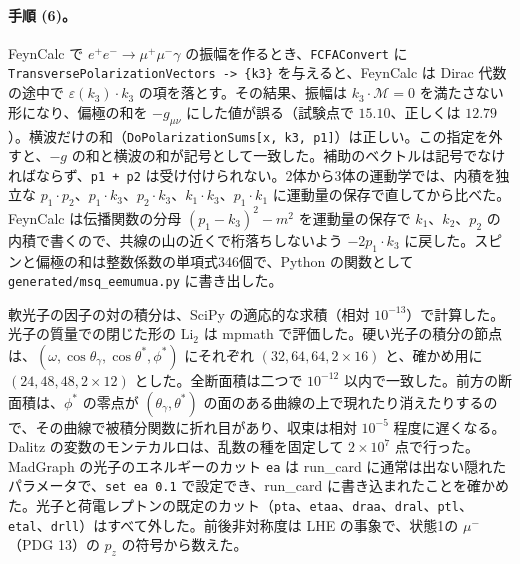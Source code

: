 \documentclass[a4paper,10pt]{ltjsarticle}
\begin{document}
\paragraph{手順 (6)。}FeynCalc で $e^+e^-\to\mu^+\mu^-\gamma$ の振幅を作るとき、\texttt{FCFAConvert} に \texttt{TransversePolarizationVectors -> \{k3\}} を与えると、FeynCalc は Dirac 代数の途中で $\varepsilon(k_3)\cdot k_3$ の項を落とす。その結果、振幅は $k_3\cdot\mathcal M=0$ を満たさない形になり、偏極の和を $-g_{\mu\nu}$ にした値が誤る（試験点で $15.10$、正しくは $12.79$）。横波だけの和（\texttt{DoPolarizationSums[x, k3, p1]}）は正しい。この指定を外すと、$-g$ の和と横波の和が記号として一致した。補助のベクトルは記号でなければならず、\texttt{p1 + p2} は受け付けられない。2体から3体の運動学では、内積を独立な $p_1\cdot p_2$、$p_1\cdot k_3$、$p_2\cdot k_3$、$k_1\cdot k_3$、$p_1\cdot k_1$ に運動量の保存で直してから比べた。FeynCalc は伝播関数の分母 $(p_1-k_3)^2-m^2$ を運動量の保存で $k_1$、$k_2$、$p_2$ の内積で書くので、共線の山の近くで桁落ちしないよう $-2p_1\cdot k_3$ に戻した。スピンと偏極の和は整数係数の単項式346個で、Python の関数として \texttt{generated/msq\_eemumua.py} に書き出した。

軟光子の因子の対の積分は、SciPy の適応的な求積（相対 $10^{-13}$）で計算した。光子の質量での閉じた形の $\mathrm{Li}_2$ は mpmath で評価した。硬い光子の積分の節点は、$(\omega,\cos\theta_\gamma,\cos\theta^*,\phi^*)$ にそれぞれ $(32,64,64,2\times16)$ と、確かめ用に $(24,48,48,2\times12)$ とした。全断面積は二つで $10^{-12}$ 以内で一致した。前方の断面積は、$\phi^*$ の零点が $(\theta_\gamma,\theta^*)$ の面のある曲線の上で現れたり消えたりするので、その曲線で被積分関数に折れ目があり、収束は相対 $10^{-5}$ 程度に遅くなる。Dalitz の変数のモンテカルロは、乱数の種を固定して $2\times10^7$ 点で行った。MadGraph の光子のエネルギーのカット \texttt{ea} は run\_card に通常は出ない隠れたパラメータで、\texttt{set ea 0.1} で設定でき、run\_card に書き込まれたことを確かめた。光子と荷電レプトンの既定のカット（\texttt{pta}、\texttt{etaa}、\texttt{draa}、\texttt{dral}、\texttt{ptl}、\texttt{etal}、\texttt{drll}）はすべて外した。前後非対称度は LHE の事象で、状態1の $\mu^-$（PDG 13）の $p_z$ の符号から数えた。
\end{document}
